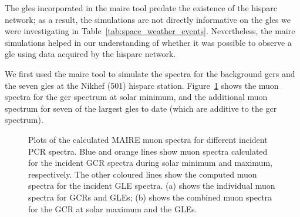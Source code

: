 The \glspl{gle} incorporated in the \gls{maire} tool predate the existence of the \gls{hisparc} network; as a result, the simulations are not directly informative on the \glspl{gle} we were investigating in Table~\ref{tab:space_weather_events}. Nevertheless, the \gls{maire} simulations helped in our understanding of whether it was possible to observe a \gls{gle} using data acquired by the \gls{hisparc} network.


We first used the \gls{maire} tool to simulate the spectra for the background \glspl{gcr} and the seven \glspl{gle} at the Nikhef (501) \gls{hisparc} station. Figure~\ref{fig:MAIRE_muon_spectra} shows the muon spectra for the \gls{gcr} spectrum at solar minimum, and the additional muon spectrum for seven of the largest \glspl{gle} to date (which are additive to the \gls{gcr} spectrum).


\begin{figure}[ht!]
	\centering
	\qquad
	\caption{Plots of the calculated MAIRE muon spectra for different incident PCR spectra. Blue and orange lines show muon spectra calculated for the incident GCR spectra during solar minimum and maximum, respectively. The other coloured lines show the computed muon spectra for the incident GLE spectra. (a) shows the individual muon spectra for GCRs and GLEs; (b) shows the combined muon spectra for the GCR at solar maximum and the GLEs.}
	\label{fig:MAIRE_muon_spectra}
\end{figure}


